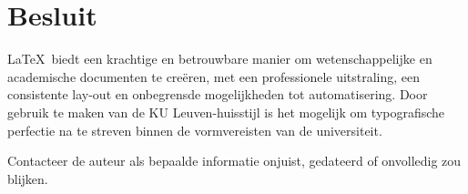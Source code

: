 \documentclass[kulak]{kulakarticle} %
\begin{document}
\section{Besluit}

\LaTeX\ biedt een krachtige en betrouwbare manier om wetenschappelijke en academische documenten te creëren, met een professionele uitstraling, een consistente lay-out en onbegrensde mogelijkheden tot automatisering. Door gebruik te maken van de KU Leuven-huisstijl is het mogelijk om typografische perfectie na te streven binnen de vormvereisten van de universiteit.

Contacteer de auteur als bepaalde informatie onjuist, gedateerd of onvolledig zou blijken.
\end{document}
